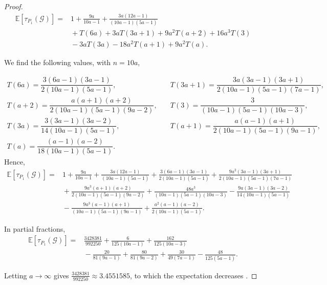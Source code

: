 \documentclass[10pt,a4paper]{amsart}
\newcommand{\E}{\mathbb{E}}
\newcommand{\Gscr}{\mathscr{G}}
\begin{document}
\begin{proof}
\[
\begin{aligned}
\E[\tau_{P_1}(\Gscr)]
={}&1+\frac{9a}{10a-1}
+\frac{3a(12a-1)}{(10a-1)(5a-1)}\\
&{}+T(6a)
+3aT(3a+1)
+9a^2T(a+2)
+16a^3T(3)\\
&{}-3aT(3a)
-18a^2T(a+1)
+9a^2T(a).
\end{aligned}
\]

We find the following values, with $n=10a$,


\[
\begin{array}{ll}
T(6a)=\dfrac{3(6a-1)(3a-1)}{2(10a-1)(5a-1)},
   & \quad
T(3a+1)=\dfrac{3a(3a-1)(3a+1)}{2(10a-1)(5a-1)(7a-1)},\\[2ex]
T(a+2)=\dfrac{a(a+1)(a+2)}{2(10a-1)(5a-1)(9a-2)},
   & \quad
T(3)=\dfrac{3}{(10a-1)(5a-1)(10a-3)},\\[2ex]
T(3a)=\dfrac{3(3a-1)(3a-2)}{14(10a-1)(5a-1)},
   & \quad
T(a+1)=\dfrac{a(a-1)(a+1)}{2(10a-1)(5a-1)(9a-1)},\\[2ex]
T(a)=\dfrac{(a-1)(a-2)}{18(10a-1)(5a-1)}.
   &
\end{array}
\]
Hence, 
\[
\begin{aligned}
\E[\tau_{P_1}(\Gscr)]
={}&1+\frac{9a}{10a-1}
+\frac{3a(12a-1)}{(10a-1)(5a-1)}
+\frac{3(6a-1)(3a-1)}
{2(10a-1)(5a-1)}+\frac{9a^2(3a-1)(3a+1)}
{2(10a-1)(5a-1)(7a-1)}\\
&{}+\frac{9a^3(a+1)(a+2)}
{2(10a-1)(5a-1)(9a-2)}+\frac{48a^3}
{(10a-1)(5a-1)(10a-3)}-\frac{9a(3a-1)(3a-2)}
{14(10a-1)(5a-1)}\\
&{}-\frac{9a^3(a-1)(a+1)}
{(10a-1)(5a-1)(9a-1)}+\frac{a^2(a-1)(a-2)}
{2(10a-1)(5a-1)}.
\end{aligned}
\]

In partial fractions,
\[
\begin{aligned}
\E[\tau_{P_1}(\Gscr)]
={}&
\frac{3428381}{992250}
+\frac{6}{125(10a-1)}
+\frac{162}{125(10a-3)}\\
&{}-\frac{20}{81(9a-1)}
+\frac{80}{81(9a-2)}
+\frac{30}{49(7a-1)}
-\frac{48}{125(5a-1)}.
\end{aligned}
\]


Letting $a\to\infty$ gives
$\tfrac{3428381}{992250}\approx3.4551585$, to which the expectation decreases .
\end{proof}
\end{document}
